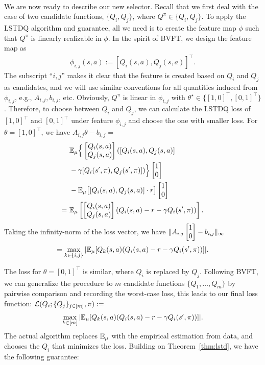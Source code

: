 \paragraph{\lstd} We are now ready to describe our new selector. Recall that we first deal with the case of two candidate functions, $\{Q_i, Q_j\}$, where $Q^\pi \in \{Q_i, Q_j\}$. To apply the LSTDQ algorithm and guarantee, all we need is to create the feature map $\phi$ such that $Q^\pi$ is linearly realizable in $\phi$. In the spirit of BVFT, we design the feature map as
\begin{align} \label{eq:feature}
\phi_{i,j}(s,a):= [Q_i(s,a), Q_j(s,a)]^\top.
\end{align}
The subscript ``$i,j$'' makes it clear that the feature is created based on $Q_i$ and $Q_j$ as candidates, and we will use similar conventions for all quantities induced from $\phi_{i,j}$, e.g., $A_{i,j}, b_{i,j}$, etc. Obviously, $Q^\pi$ is linear in $\phi_{i,j}$ with $\theta^\star \in \{[1, 0]^\top, [0, 1]^\top\}$. Therefore, to choose between $Q_i$ and $Q_j$, we can calculate the LSTDQ loss of $[1, 0]^\top$ and $[0, 1]^\top$ under feature $\phi_{i,j}$ and choose the one with smaller loss. For $\theta = [1, 0]^\top$,  we have $A_{i,j} \theta - b_{i,j} =$
\begin{align}
&~ \mathbb{E}_{\mu}\Big\{\begin{bmatrix} Q_i(s,a) \\ Q_j(s,a) \end{bmatrix} ([Q_i(s,a), Q_j(s,a)] \\
&~ - \gamma [Q_i(s',\pi), Q_j(s',\pi)])\Big\} \begin{bmatrix} 1 \\ 0 \end{bmatrix} \\
&~ -  \mathbb{E}_{\mu}\big[[Q_i(s,a), Q_j(s,a)] \cdot r \big] \begin{bmatrix} 1 \\ 0 \end{bmatrix} \\
= &~ \mathbb{E}_{\mu}\left[\begin{bmatrix} Q_i(s,a) \\ Q_j(s,a) \end{bmatrix} (Q_i(s,a) - r - \gamma Q_i(s',\pi)) \right].
\end{align}
Taking the infinity-norm of the loss vector, we have $\|A_{i,j} \begin{bmatrix} 1 \\ 0 \end{bmatrix} - b_{i,j}\|_\infty$
\begin{align}
= \max_{k \in \{i,j\}} |\mathbb{E}_{\mu}[Q_k(s,a) (Q_i(s,a) - r - \gamma Q_i(s',\pi))]|.
\end{align}

The loss for $\theta = [0, 1]^\top$ is similar, where $Q_i$ is replaced by $Q_j$. Following BVFT, we can generalize the procedure to $m$ candidate functions $\{Q_1, \ldots, Q_m\}$ by pairwise comparison and recording the worst-case loss, this leads to our final loss function: $\mathcal{L}(Q_i; \{Q_j\}_{j\in[m]}, \pi):=$
\begin{align}\label{eq:tour}
\max_{k \in [m]} |\mathbb{E}_{\mu}[Q_k(s,a) (Q_i(s,a) - r - \gamma Q_i(s',\pi))]|.
\end{align}
The actual algorithm replaces $\mathbb{E}_{\mu}$ with the empirical estimation from data, and chooses the $Q_i$ that minimizes the loss. Building on Theorem~\ref{thm:lstd}, we have the following guarantee:

